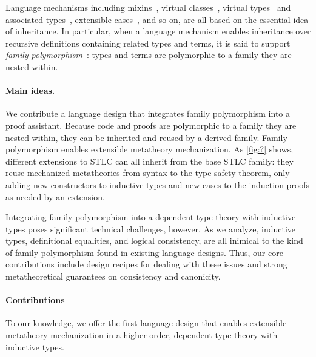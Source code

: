 Language mechanisms including
mixins~\cite{mixin-1990},
virtual classes~\cite{virtualclasses-1989,vc-calculus-2006},
virtual types~\cite{thorup97} and associated types~\cite{ckj05},
extensible cases~\cite{bac2006},
and so on, are all based on the essential idea of inheritance.
%
In particular, when a language mechanism enables inheritance over
recursive definitions containing related types and terms,
it is said to support \emph{family polymorphism}~\cite{ernst2001family}:
types and terms are polymorphic to a family they are nested within.

\paragraph{Main ideas.}

We contribute a language design that integrates family polymorphism into
a proof assistant.
Because code and proofs are polymorphic to a family they are nested
within, they can be inherited and reused by a derived family.
%
Family polymorphism enables extensible metatheory mechanization.
As \cref{fig:?} shows,
different extensions to STLC can all inherit from the base STLC family:
they reuse mechanized metatheories from syntax to the type safety
theorem, only adding new constructors to inductive types
and new cases to the induction proofs as needed by an extension.

Integrating family polymorphism into a dependent type theory with
inductive types poses significant technical challenges, however.
As we analyze, inductive types, definitional equalities, and logical
consistency, are all inimical to the kind of family polymorphism
found in existing language designs.
Thus, our core contributions include design recipes for dealing with
these issues and strong metatheoretical guarantees on consistency and
canonicity.

\paragraph{Contributions} To our knowledge, we offer the first
language design that enables extensible metatheory mechanization
in a higher-order, dependent type theory with inductive types.


